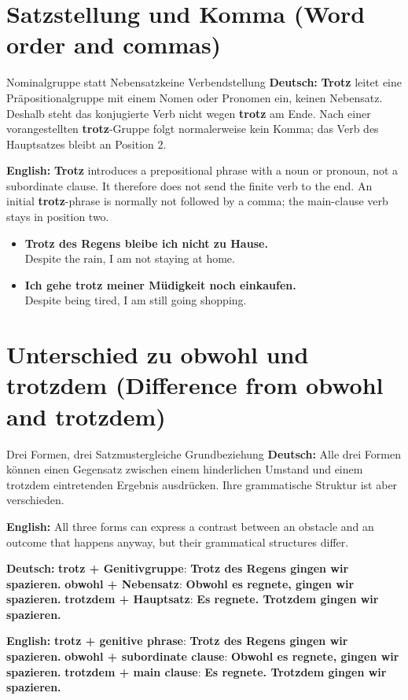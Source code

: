 \documentclass[a4paper,11pt]{article}
\newcommand{\GermanText}[1]{\textbf{Deutsch: }#1\par}
\newcommand{\EnglishText}[1]{{\small\color{SoftGray}\textbf{English: }#1\par}}
\newcommand{\ExampleItem}[2]{\item \textbf{#1}\\{\small\color{SoftGray}#2}}
\begin{document}
\section{Satzstellung und Komma \textnormal{(Word order and commas)}}
\begin{grammarentry}{Nominalgruppe statt Nebensatz}{keine Verbendstellung}
\GermanText{\textbf{Trotz} leitet eine Präpositionalgruppe mit einem Nomen oder Pronomen ein, keinen Nebensatz. Deshalb steht das konjugierte Verb nicht wegen \textbf{trotz} am Ende. Nach einer vorangestellten \textbf{trotz}-Gruppe folgt normalerweise kein Komma; das Verb des Hauptsatzes bleibt an Position 2.}
\EnglishText{\textbf{Trotz} introduces a prepositional phrase with a noun or pronoun, not a subordinate clause. It therefore does not send the finite verb to the end. An initial \textbf{trotz}-phrase is normally not followed by a comma; the main-clause verb stays in position two.}
\end{grammarentry}
\begin{exbox}
\begin{itemize}
\ExampleItem{Trotz des Regens bleibe ich nicht zu Hause.}{Despite the rain, I am not staying at home.}
\ExampleItem{Ich gehe trotz meiner Müdigkeit noch einkaufen.}{Despite being tired, I am still going shopping.}
\end{itemize}
\end{exbox}

\section{Unterschied zu \glqq obwohl\grqq{} und \glqq trotzdem\grqq{} \textnormal{(Difference from \glqq obwohl\grqq{} and \glqq trotzdem\grqq)}}
\begin{grammarentry}{Drei Formen, drei Satzmuster}{gleiche Grundbeziehung}
\GermanText{Alle drei Formen können einen Gegensatz zwischen einem hinderlichen Umstand und einem trotzdem eintretenden Ergebnis ausdrücken. Ihre grammatische Struktur ist aber verschieden.}
\EnglishText{All three forms can express a contrast between an obstacle and an outcome that happens anyway, but their grammatical structures differ.}
\GermanText{\textbf{trotz + Genitivgruppe}: \textbf{Trotz des Regens gingen wir spazieren.} \quad \textbf{obwohl + Nebensatz}: \textbf{Obwohl es regnete, gingen wir spazieren.} \quad \textbf{trotzdem + Hauptsatz}: \textbf{Es regnete. Trotzdem gingen wir spazieren.}}
\EnglishText{\textbf{trotz + genitive phrase}: \textbf{Trotz des Regens gingen wir spazieren.} \quad \textbf{obwohl + subordinate clause}: \textbf{Obwohl es regnete, gingen wir spazieren.} \quad \textbf{trotzdem + main clause}: \textbf{Es regnete. Trotzdem gingen wir spazieren.}}
\end{grammarentry}
\end{document}
